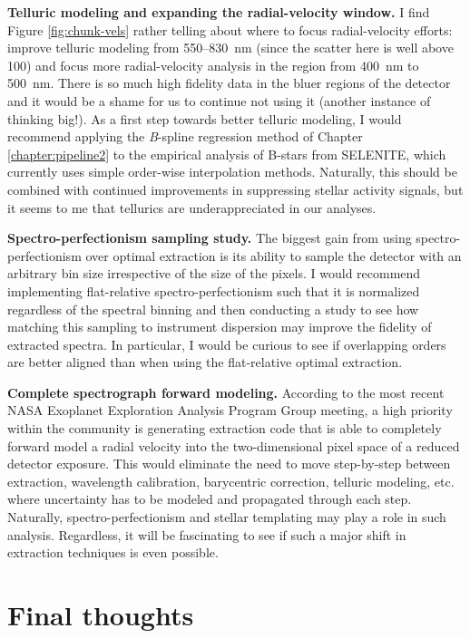 \textbf{Telluric modeling and expanding the radial-velocity window.} I find Figure \ref{fig:chunk-vels} rather telling about where to focus radial-velocity efforts: improve telluric modeling from 550--830~\si{\nano\meter} (since the scatter here is well above 100\ms) and focus more radial-velocity analysis in the region from 400~\si{\nano\meter} to 500~\si{\nano\meter}. There is so much high fidelity data in the bluer regions of the detector and it would be a shame for us to continue not using it (another instance of thinking big!). As a first step towards better telluric modeling, I would recommend applying the \textit{B}-spline regression method of Chapter \ref{chapter:pipeline2} to the empirical analysis of B-stars from SELENITE, which currently uses simple order-wise interpolation methods. Naturally, this should be combined with continued improvements in suppressing stellar activity signals, but it seems to me that tellurics are underappreciated in our analyses.

\textbf{Spectro-perfectionism sampling study.} The biggest gain from using spectro-per\-fectionism over optimal extraction is its ability to sample the detector with an arbitrary bin size irrespective of the size of the pixels. I would recommend implementing flat-relative spectro-perfectionism such that it is normalized regardless of the spectral binning and then conducting a study to see how matching this sampling to instrument dispersion may improve the fidelity of extracted spectra. In particular, I would be curious to see if overlapping orders are better aligned than when using the flat-relative optimal extraction.

\textbf{Complete spectrograph forward modeling.} According to the most recent NASA Exo\-planet Exploration Analysis Program Group meeting, a high priority within the community is generating extraction code that is able to completely forward model a radial velocity into the two-dimensional pixel space of a reduced detector exposure. This would eliminate the need to move step-by-step between extraction, wavelength calibration, bary\-centric correction, telluric modeling, etc. where uncertainty has to be modeled and propagated through each step. Naturally, spectro-perfectionism and stellar templating may play a role in such analysis. Regardless, it will be fascinating to see if such a major shift in extraction techniques is even possible.

\section{Final thoughts} \label{conclusion:final}


